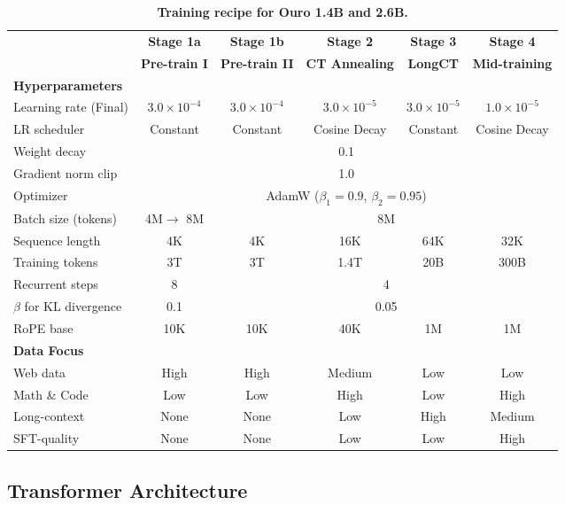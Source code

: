 \documentclass[]{bytedance_seed}
\newcommand{\1}{\mathbf{1}}
\begin{document}
\begin{table}[h!]
\small
\centering
\caption{\textbf{Training recipe for Ouro 1.4B and 2.6B.}}
\label{tab:training_recipe}
\begin{tabular}{l|ccccc}
\toprule
 & \textbf{Stage 1a} & \textbf{Stage 1b} & \textbf{Stage 2} & \textbf{Stage 3} & \textbf{Stage 4} \\
 & \textbf{Pre-train I} & \textbf{Pre-train II} & \textbf{CT Annealing} & \textbf{LongCT} & \textbf{Mid-training} \\
\hline
\textbf{Hyperparameters} \\
Learning rate (Final) & $3.0\times10^{-4}$ & $3.0\times10^{-4}$ & $3.0\times10^{-5}$ & $3.0\times10^{-5}$ & $1.0\times10^{-5}$ \\
LR scheduler & Constant & Constant & Cosine Decay & Constant & Cosine Decay \\
Weight decay & \multicolumn{5}{c}{0.1} \\
Gradient norm clip & \multicolumn{5}{c}{1.0} \\
Optimizer & \multicolumn{5}{c}{AdamW ($\beta_1=0.9$, $\beta_2=0.95$)} \\
Batch size (tokens) &4M$\rightarrow$ 8M & \multicolumn{4}{c}{8M} \\
Sequence length & 4K & 4K & 16K & 64K & 32K \\
Training tokens & 3T & 3T & 1.4T & 20B & 300B \\
Recurrent steps & 8 & \multicolumn{4}{c}{4} \\
$\beta$ for KL divergence & 0.1 & \multicolumn{4}{c}{0.05} \\
RoPE base & 10K & 10K & 40K & 1M & 1M \\
\midrule
\textbf{Data Focus} \\
Web data & High & High & Medium & Low & Low \\
Math \& Code & Low & Low & High & Low & High \\
Long-context & None & None & Low & High & Medium \\
SFT-quality & None & None & Low & Low & High \\
\bottomrule
\end{tabular}
\end{table}

\subsection{Transformer Architecture} 
\end{document}

